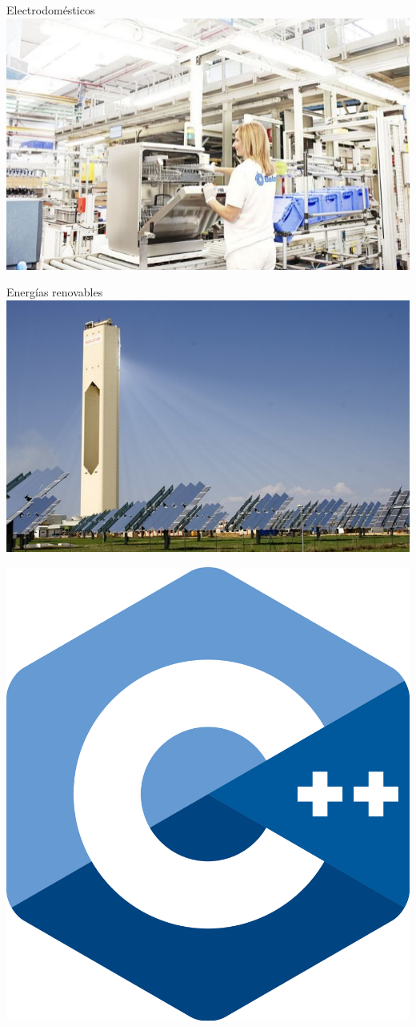 \begin{frame}{Electrodomésticos}
\centering
\includegraphics[height=.85\textheight]{img/electrod-balay.jpg}
\end{frame}

\begin{frame}{Energías renovables}
\centering
\includegraphics[height=.85\textheight]{img/heliostatos.jpg}
\end{frame}

\begin{frame}
\centering
\includegraphics[height=.9\textheight]{logos/cpp.png}
\end{frame}
